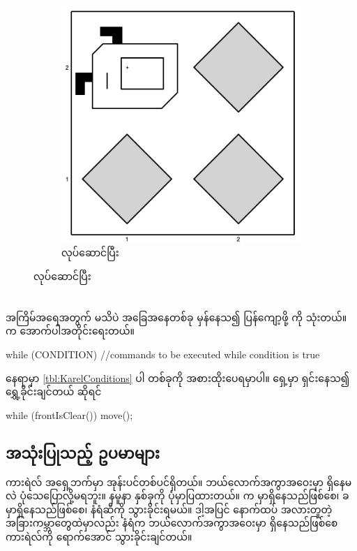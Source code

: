 \begin{sloppypar}
\begin{figure}[tbh!]
    \begin{subfigure}[t]{0.46\textwidth}
        \includegraphics[scale=0.17, left]{ch02/MakeBeeperSquare/3rd_iter.jpg}
        \caption{ \mmcommand လုပ်ဆောင်ပြီး}
    \end{subfigure}
    \hspace{0.1in}
    \label{fig:MakeBeeperSquareIters}
\end{figure}



\section{ }
အကြိမ်အရေအတွက် မသိပဲ အခြေအနေတစ်ခု မှန်နေသ၍ ပြန်ကျော့ဖို့ \enWhileLoop ကို သုံးတယ်။ \mmsyntax က အောက်ပါအတိုင်းရေးတယ်။  
\begin{lstcodeminimal}
while (CONDITION) {
    //commands to be executed while condition is true
}
\end{lstcodeminimal}
 နေရာမှာ \vref*{tbl:KarelConditions} ပါ \mmCondition တစ်ခုကို အစားထိုးပေရမှာပါ။ ရှေ့မှာ ရှင်းနေသ၍ ရွှေ့ခိုင်းချင်တယ် ဆိုရင်
\begin{lstcodeminimal}
while (frontIsClear()) {
    move();
}
\end{lstcodeminimal}

\subsection{  အသုံးပြုသည့် ဥပမာများ}
ကားရဲလ် အရှေ့ဘက်မှာ အုန်းပင်တစ်ပင်ရှိတယ်။ ဘယ်လောက်အကွာအဝေးမှာ ရှိနေမလဲ ပုံသေပြောလို့မရဘူး။ နမူနာ နှစ်ခုကို ပုံမှာပြထားတယ်။ က မှာရှိနေသည်ဖြစ်စေ၊ ခ မှာရှိနေသည်ဖြစ်စေ၊ နံရံဆီကို သွားခိုင်းရမယ်။ ဒါ့အပြင် နောက်ထပ် အလားတူတဲ့  အခြားကမ္ဘာတွေထဲမှာလည်း နံရံက ဘယ်လောက်အကွာအဝေးမှာ ရှိနေသည်ဖြစ်စေ ကားရဲလ်ကို ရောက်အောင် သွားခိုင်းချင်တယ်။ 


\end{sloppypar}
